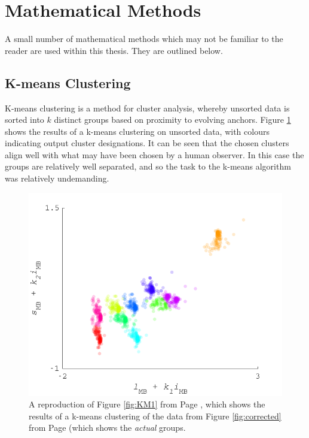 \section{Mathematical Methods}
\label{sec:math}

A small number of mathematical methods which may not be familiar to the reader are used within this thesis. They are outlined below.

\subsection{K-means Clustering}

K-means clustering is a method for cluster analysis, whereby unsorted data is sorted into $k$ distinct groups based on proximity to evolving anchors. Figure \ref{fig:KM1lr} shows the results of a k-means clustering on unsorted data, with colours indicating output cluster designations. It can be seen that the chosen clusters align well with what may have been chosen by a human observer. In this case the groups are relatively well separated, and so the task to the k-means algorithm was relatively undemanding.

\begin{figure}[htbp]
 \includegraphics[max width=\textwidth]{figs/comp/KMeansMarkDemo/1.pdf}
 \caption{A reproduction of Figure \ref{fig:KM1} from Page \pageref{fig:KM1}, which shows the results of a k-means clustering of the data from Figure \ref{fig:corrected} from Page \pageref{fig:corrected} (which shows the \emph{actual} groups.}
 \label{fig:KM1lr}
\end{figure} 

